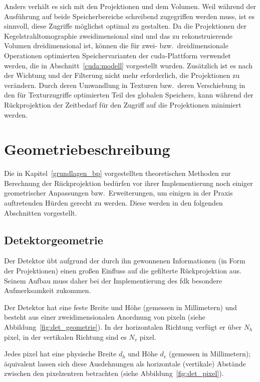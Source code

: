 Anders verhält es sich mit den Projektionen und dem Volumen. Weil während der Ausführung auf beide Speicherbereiche
schreibend zugegriffen werden muss, ist es sinnvoll, diese Zugriffe möglichst optimal zu gestalten. Da die Projektionen
der Kegelstrahltomographie zweidimensional sind und das zu rekonstruierende Volumen dreidimensional ist, können die für
zwei- bzw.\ dreidimensionale Operationen optimierten Speichervarianten der \gls{cuda}-Plattform verwendet werden, die in
Abschnitt~\ref{cuda:modell} vorgestellt wurden. Zusätzlich ist es nach der Wichtung und der Filterung nicht mehr
erforderlich, die Projektionen zu verändern. Durch deren Umwandlung in Texturen bzw.\ deren Verschiebung in den für
Texturzugriffe optimierten Teil des globalen Speichers, kann während der Rückprojektion der Zeitbedarf für den Zugriff
auf die Projektionen minimiert werden.

\section{Geometriebeschreibung}

Die in Kapitel~\ref{grundlagen_bp} vorgestellten theoretischen Methoden zur Berechnung der Rückprojektion bedürfen vor
ihrer Implementierung noch einiger geometrischer Anpassungen bzw.\ Erweiterungen, um einigen in der Praxis auftretenden
Hürden gerecht zu werden. Diese werden in den folgenden Abschnitten vorgestellt.

\subsection{Detektorgeometrie}

Der Detektor übt aufgrund der durch ihn gewonnenen Informationen (in Form der Projektionen) einen großen Einfluss auf
die gefilterte Rückprojektion aus. Seinem Aufbau muss daher bei der Implementierung des \gls{fdk} besondere
Aufmerksamkeit zukommen.

Der Detektor hat eine feste Breite und Höhe (gemessen in Millimetern) und besteht aus einer zweidimensionalen Anordnung
von \gls{pixel}n (siehe Abbildung~\ref{fig:det_geometrie}). In der horizontalen Richtung verfügt er über $N_h$
\gls{pixel}, in der vertikalen Richtung sind es $N_v$ \gls{pixel}.

Jedes \gls{pixel} hat eine physische Breite $d_h$ und Höhe $d_v$ (gemessen in Millimetern); äquivalent lassen sich diese
Ausdehnungen als horizontale (vertikale) Abstände zwischen den \gls{pixel}zentren betrachten (siehe
Abbildung~\ref{fig:det_pixel}).

